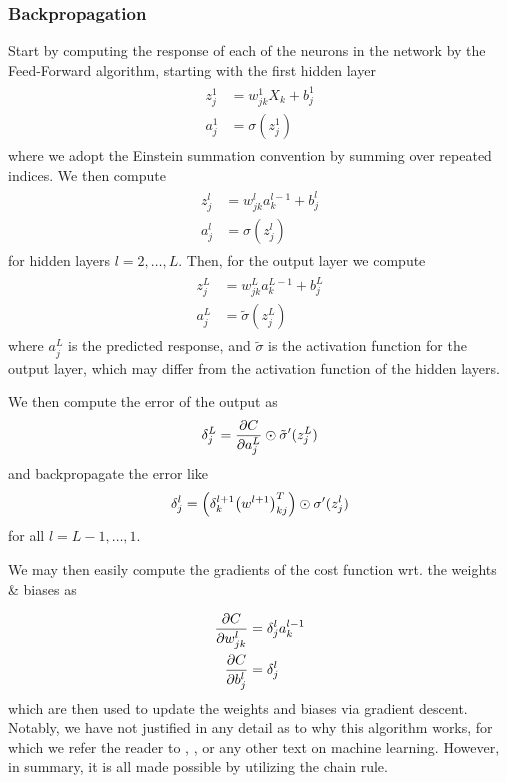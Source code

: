 \documentclass[reprint, english, nofootinbib]{revtex4-2}
\begin{document}
\subsubsection{Backpropagation}
\noindent
Start by computing the response of each of the neurons in the network by the Feed-Forward algorithm, starting with the first hidden layer
\begin{align}\label{eqn: FeedForward Initial}
    \begin{split}
        z^1_j &= w^1_{jk}X_k + b^1_j \\
        a^1_j &= \sigma(z^1_j)
    \end{split}
\end{align}
where we adopt the Einstein summation convention by summing over repeated indices.
We then compute
\begin{align}
    \begin{split}
        z^l_{j} &= w^l_{jk}a^{l-1}_k + b^l_j \\
        a^l_{j} &= \sigma(z^l_{j})
    \end{split}
\end{align}
for hidden layers $l = 2, \dots, L$. Then, for the output layer we compute
\begin{align}
    \begin{split}
        z^{L}_j &= w^{L}_{jk}a^{L-1}_k + b^{L}_j \\
        a^{L}_j &= \tilde\sigma(z^{L}_j)
    \end{split}
\end{align}
where $a^{L}_j$ is the predicted response, and $\tilde\sigma$ is the activation function for the output layer, which may differ from the activation function of the hidden layers.

We then compute the error of the output as
\begin{equation}
    \delta^{L}_j = \pdv{C}{a^{L}_{j}} \odot \tilde\sigma'(z^{L}_j)
\end{equation}
and backpropagate the error like
\begin{equation}
    \delta^{l}_j = \qty(\delta^{l+1}_{k}\qty(w^{l+1})^T_{kj}) \odot \sigma'(z^l_j)
\end{equation}
for all $l = L-1, \dots, 1$.

We may then easily compute the gradients of the cost function wrt. the weights \& biases as

\begin{align}
    \begin{split}
        \pdv{C}{w_{jk}^l} &= \delta_j^l a^{l-1}_k \\
        \pdv{C}{b^l_j} &= \delta_j^l
    \end{split}
\end{align}
which are then used to update the weights and biases via gradient descent. Notably, we have not justified in any detail as to why this algorithm works, for which we refer the reader to \textcite{Mehta_2019}, \textcite{hastie}, or any other text on machine learning. However, in summary, it is all made possible by utilizing the chain rule.
\end{document}
